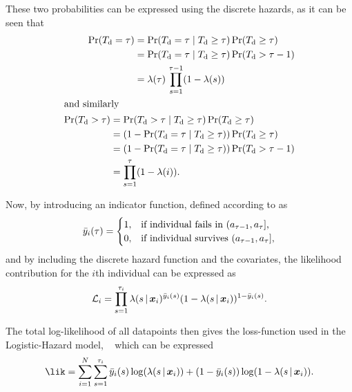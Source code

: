 These two probabilities can be expressed using the discrete hazards,
as it can be seen that
\begin{align}
    \begin{split}
    \operatorname{\Pr} ({T_{\mathrm{d}}} = \tau) 
    &= \operatorname{\Pr} ({T_{\mathrm{d}}} = \tau \mid {T_{\mathrm{d}}} \geq \tau) \operatorname{\Pr} ({T_{\mathrm{d}}}  \geq \tau) \\
    &= \operatorname{\Pr} ({T_{\mathrm{d}}} = \tau \mid {T_{\mathrm{d}}} \geq \tau) \operatorname{\Pr} ({T_{\mathrm{d}}}  > \tau - 1) \\
    &= \lambda (\tau) \, \prod_{s=1}^{\tau - 1} (1 - \lambda(s))
    \end{split} \\
    \intertext{and similarly}
    \begin{split}
    \operatorname{\Pr} ({T_{\mathrm{d}}} > \tau) 
        &= \operatorname{\Pr} ({T_{\mathrm{d}}} > \tau \mid {T_{\mathrm{d}}} \geq \tau) \operatorname{\Pr} ({T_{\mathrm{d}}}  \geq \tau) \\
        &= (1 - \operatorname{\Pr} ({T_{\mathrm{d}}} = \tau \mid {T_{\mathrm{d}}} \geq \tau)) \operatorname{\Pr} ({T_{\mathrm{d}}}  \geq \tau) \\
        &= (1 - \operatorname{\Pr} ({T_{\mathrm{d}}} = \tau \mid {T_{\mathrm{d}}} \geq \tau)) \operatorname{\Pr} ({T_{\mathrm{d}}}  > \tau - 1) \\
        &= \prod_{s=1}^{\tau} (1 - \lambda(i)).
    \end{split}
\end{align}

Now, by introducing an indicator function, 
defined according to \textcite{tutzModeling2016} as 
\begin{equation}
    \label{eq:lh-indicator}
    \bar{y}_i(\tid) = \begin{cases}
        1, & \text{if individual fails in \((a_{\tid-1}, a_{\tid}]\),} \\
        0, & \text{if individual survives \((a_{\tid-1}, a_{\tid}]\),}
    \end{cases}
\end{equation}
and by including the discrete hazard function and the covariates, 
the likelihood contribution for the \(i\)th individual can be expressed as
\begin{equation}
    \label{eq:lh-likelihood}
    \Lik_i = \prod_{s=1}^{\tid_i} 
        \lambda(s \giv \vec{x}_i)^{\bar{y}_i(s)}
        (1 - \lambda(s \giv \vec{x}_i))^{1 - \bar{y}_i(s)}.
\end{equation}

The total log-likelihood of all datapoints then gives the loss-function
used in the Logistic-Hazard model, 
~\autocite{gensheimerScalable2019, tutzModeling2016}
which can be expressed
\begin{equation}
    \label{eq:lh-loglikelihood}
    \lik = 
        \sum_{i = 1}^{N} 
            \sum_{s=1}^{\tid_i} 
                \bar{y}_i(s) \log (\lambda(s\giv\vec{x}_i))
                + (1 - \bar{y}_i(s)) \log (1 - \lambda(s\giv\vec{x}_i)).
\end{equation}

